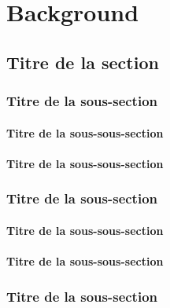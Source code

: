 \chapter{Background} %


\section{Titre de la section}
\subsection{Titre de la sous-section}

\subsubsection{Titre de la sous-sous-section}
\subsubsection{Titre de la sous-sous-section}
\cite{Faulkes2021}

\subsection{Titre de la sous-section}

\subsubsection{Titre de la sous-sous-section}

\subsubsection{Titre de la sous-sous-section}

\subsection{Titre de la sous-section}


